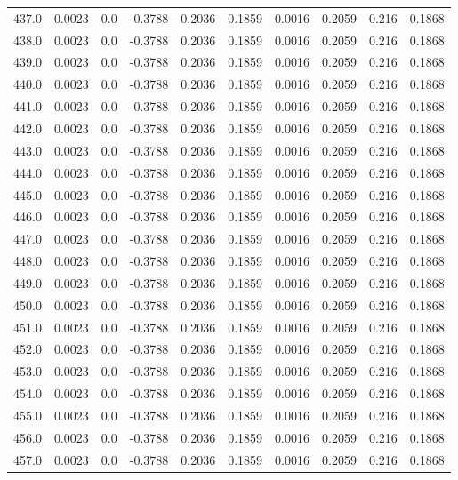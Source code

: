 \begin{longtable}{lrrrrrrrrr}
437.0 & 0.0023 & 0.0 & -0.3788 & 0.2036 & 0.1859 & 0.0016 & 0.2059 & 0.216 & 0.1868 \\
438.0 & 0.0023 & 0.0 & -0.3788 & 0.2036 & 0.1859 & 0.0016 & 0.2059 & 0.216 & 0.1868 \\
439.0 & 0.0023 & 0.0 & -0.3788 & 0.2036 & 0.1859 & 0.0016 & 0.2059 & 0.216 & 0.1868 \\
440.0 & 0.0023 & 0.0 & -0.3788 & 0.2036 & 0.1859 & 0.0016 & 0.2059 & 0.216 & 0.1868 \\
441.0 & 0.0023 & 0.0 & -0.3788 & 0.2036 & 0.1859 & 0.0016 & 0.2059 & 0.216 & 0.1868 \\
442.0 & 0.0023 & 0.0 & -0.3788 & 0.2036 & 0.1859 & 0.0016 & 0.2059 & 0.216 & 0.1868 \\
443.0 & 0.0023 & 0.0 & -0.3788 & 0.2036 & 0.1859 & 0.0016 & 0.2059 & 0.216 & 0.1868 \\
444.0 & 0.0023 & 0.0 & -0.3788 & 0.2036 & 0.1859 & 0.0016 & 0.2059 & 0.216 & 0.1868 \\
445.0 & 0.0023 & 0.0 & -0.3788 & 0.2036 & 0.1859 & 0.0016 & 0.2059 & 0.216 & 0.1868 \\
446.0 & 0.0023 & 0.0 & -0.3788 & 0.2036 & 0.1859 & 0.0016 & 0.2059 & 0.216 & 0.1868 \\
447.0 & 0.0023 & 0.0 & -0.3788 & 0.2036 & 0.1859 & 0.0016 & 0.2059 & 0.216 & 0.1868 \\
448.0 & 0.0023 & 0.0 & -0.3788 & 0.2036 & 0.1859 & 0.0016 & 0.2059 & 0.216 & 0.1868 \\
449.0 & 0.0023 & 0.0 & -0.3788 & 0.2036 & 0.1859 & 0.0016 & 0.2059 & 0.216 & 0.1868 \\
450.0 & 0.0023 & 0.0 & -0.3788 & 0.2036 & 0.1859 & 0.0016 & 0.2059 & 0.216 & 0.1868 \\
451.0 & 0.0023 & 0.0 & -0.3788 & 0.2036 & 0.1859 & 0.0016 & 0.2059 & 0.216 & 0.1868 \\
452.0 & 0.0023 & 0.0 & -0.3788 & 0.2036 & 0.1859 & 0.0016 & 0.2059 & 0.216 & 0.1868 \\
453.0 & 0.0023 & 0.0 & -0.3788 & 0.2036 & 0.1859 & 0.0016 & 0.2059 & 0.216 & 0.1868 \\
454.0 & 0.0023 & 0.0 & -0.3788 & 0.2036 & 0.1859 & 0.0016 & 0.2059 & 0.216 & 0.1868 \\
455.0 & 0.0023 & 0.0 & -0.3788 & 0.2036 & 0.1859 & 0.0016 & 0.2059 & 0.216 & 0.1868 \\
456.0 & 0.0023 & 0.0 & -0.3788 & 0.2036 & 0.1859 & 0.0016 & 0.2059 & 0.216 & 0.1868 \\
457.0 & 0.0023 & 0.0 & -0.3788 & 0.2036 & 0.1859 & 0.0016 & 0.2059 & 0.216 & 0.1868 \\

\end{longtable}
